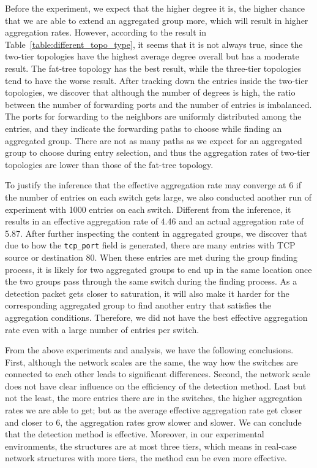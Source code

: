 \documentclass[conference]{IEEEtran}
\begin{document}
Before the experiment, we expect that the higher degree it is, the higher chance that we are able to extend an aggregated group more, which will result in higher aggregation rates. However, according to the result in Table~\ref{table:different_topo_type}, it seems that it is not always true, since the two-tier topologies have the highest average degree overall but has a moderate result. The fat-tree topology has the best result, while the three-tier topologies tend to have the worse result. After tracking down the entries inside the two-tier topologies, we discover that although the number of degrees is high, the ratio between the number of forwarding ports and the number of entries is imbalanced. The ports for forwarding to the neighbors are uniformly distributed among the entries, and they indicate the forwarding paths to choose while finding an aggregated group. There are not as many paths as we expect for an aggregated group to choose during entry selection, and thus the aggregation rates of two-tier topologies are lower than those of the fat-tree topology. 

To justify the inference that the effective aggregation rate may converge at 6 if the number of entries on each switch gets large, we also conducted another run of experiment with 1000 entries on each switch. Different from the inference, it results in an effective aggregation rate of 4.46 and an actual aggregation rate of 5.87. After further inspecting the content in aggregated groups, we discover that due to how the \texttt{tcp\_port} field is generated, there are many entries with TCP source or destination 80. When these entries are met during the group finding process, it is likely for two aggregated groups to end up in the same location once the two groups pass through the same switch during the finding process. As a detection packet gets closer to saturation, it will also make it harder for the corresponding aggregated group to find another entry that satisfies the aggregation conditions. Therefore, we did not have the best effective aggregation rate even with a large number of entries per switch. 

From the above experiments and analysis, we have the following conclusions. First, although the network scales are the same, the way how the switches are connected to each other leads to significant differences. Second, the network scale does not have clear influence on the efficiency of the detection method. Last but not the least, the more entries there are in the switches, the higher aggregation rates we are able to get; but as the average effective aggregation rate get closer and closer to 6, the aggregation rates grow slower and slower. We can conclude that the detection method is effective. Moreover, in our experimental environments, the structures are at most three tiers, which means in real-case network structures with more tiers, the method can be even more effective.  
\end{document}
